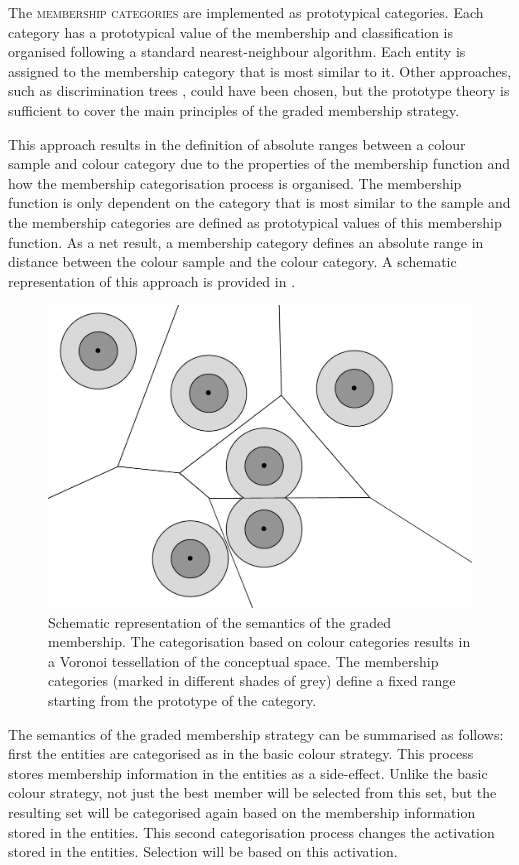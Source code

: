 The \textsc{membership categories} are implemented as prototypical
categories. Each category has a prototypical value of the membership
and classification is organised following a standard nearest-neighbour
algorithm. Each entity is assigned to the membership category that is
most similar to it. Other approaches, such as discrimination trees
\citep{steels96perceptually}, could have been chosen, but the
prototype theory is sufficient to cover the main principles of the
graded membership strategy.

This approach results in the definition of absolute ranges between a
colour sample and colour category due to the properties of the
membership function and how the membership categorisation process is
organised. The membership function is only dependent on the category
that is most similar to the sample and the membership categories are
defined as prototypical values of this membership function. As a net
result, a membership category defines an absolute range in distance
between the colour sample and the colour category. A schematic
representation of this approach is provided in .

\begin{figure}[htbp]
  \centering
  \includegraphics[width=.5\textwidth]{./graded-membership/figures/semantics-schematic.pdf}
  \caption[Schematic representation of the semantics of the graded
  membership strategy]{Schematic representation of the semantics of
    the graded membership. The categorisation based on colour
    categories results in a Voronoi tessellation of the conceptual
    space. The membership categories (marked in different shades of
    grey) define a fixed range starting from the prototype of the
    category.}
  \label{f:gms-semantics-schematic}
\end{figure}

The semantics of the graded membership strategy can be
summarised as follows: first the entities are categorised as in the
basic colour strategy. This process stores membership
information in the entities as a side-effect. Unlike the basic
  colour strategy, not just the best member will be selected from
this set, but the resulting set will be categorised again based on the
membership information stored in the entities. This second
categorisation process changes the activation stored in the
entities. Selection will be based on this activation.


